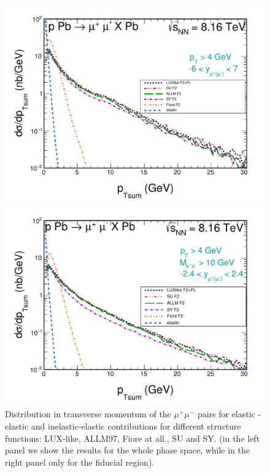 \begin{figure}[!htbp]
\begin{minipage}{0.47\textwidth}
 \centerline{\includegraphics[width=1.0\textwidth]{figures_Marta/ptsum.pdf}}
\end{minipage}
\begin{minipage}{0.47\textwidth}
 \centerline{\includegraphics[width=1.0\textwidth]{figures_Marta/ptsum-c.pdf}}
\end{minipage}
\caption{
Distribution in transverse momentum of the $\mu^+ \mu^-$ pairs for elastic - elastic and 
inelastic-elastic
contributions
for different structure functions: LUX-like, ALLM97, Fiore at all., SU and SY. (in the left panel we show the results for the whole phase space, while in the right panel only for the fiducial region).
}
 \label{fig:dsig_dMWW_ineine}
\end{figure}


